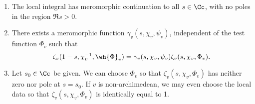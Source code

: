 \begin{theorem}[Tate]
\label{tate}
\begin{enumerate}
\item The local integral has meromorphic continuation to all $s\in\Cc$, with no poles in the region $\Re s > 0$. 
\item There exists a meromorphic function $\gamma_{v}(s, \chi_{v}, \psi_{v})$, independent of the test function $\Phi_{v}$ such that 
$$
\zeta_{v}(1-s, \chi_{v}^{-1}, \wh{\Phi}_{v}) = \gamma_{v}(s, \chi_{v}, \psi_{v}) \zeta_{v}(s, \chi_{v}, \Phi_{v}).
$$
\item Let $s_{0}\in \Cc$ be given. We can choose $\Phi_{v}$ so that $\zeta_{v}(s, \chi_{v}, \Phi_{v})$ has neither zero nor pole at $s = s_{0}$. If $v$ is non-archimedean, we may even choose the local data so that $\zeta_{v}(s, \chi_{v}, \Phi_{v})$ is identically equal to 1. 
\end{enumerate}
\end{theorem}
